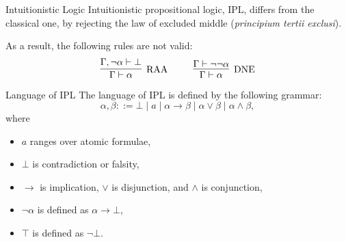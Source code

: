 \begin{frame}{Intuitionistic Logic}
    Intuitionistic propositional logic, IPL, differs from the classical one, by rejecting the law of excluded middle (\textit{principium tertii exclusi}).
    
    As a result, the following rules are not valid:
    \[
    \infer[\mbox{RAA}]{\Gamma \vdash \alpha}{\Gamma, \neg\alpha \vdash \bot}
    ~~~~ ~~~~
    \infer[\mbox{DNE}]{\Gamma \vdash \alpha}{\Gamma \vdash \neg\neg\alpha}
    \]
\end{frame}

\begin{frame}{Language of IPL}
    The language of IPL is defined by the following grammar:
    \[
    \alpha, \beta ::= \bot \mid a \mid \alpha \rightarrow \beta \mid \alpha \vee \beta \mid \alpha \wedge \beta,
    \]
    where
    \begin{itemize}
        \item $a$ ranges over atomic formulae,
        \item $\bot$ is contradiction or falsity,
        \item $\rightarrow$ is implication, $\vee$ is disjunction, and $\wedge$ is conjunction,
        \item $\neg\alpha$ is defined as $\alpha \rightarrow \bot$,
        \item $\top$ is defined as $\neg\bot$.
    \end{itemize}
\end{frame}

